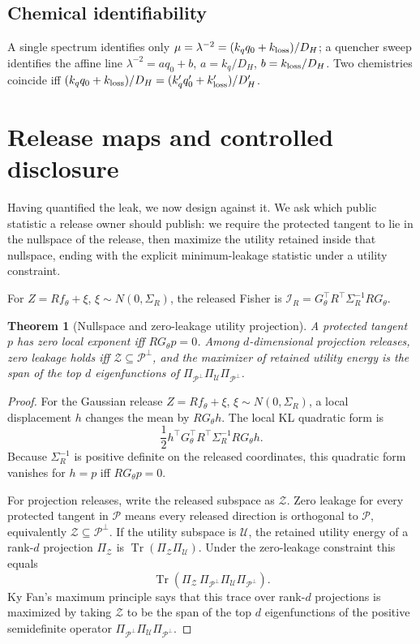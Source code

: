 \documentclass[11pt]{article}
\newtheorem{theorem}{Theorem}
\DeclareMathOperator{\Tr}{Tr}
\newcommand{\calI}{\mathcal I}
\newcommand{\calP}{\mathcal P}
\newcommand{\calU}{\mathcal U}
\newcommand{\calZ}{\mathcal Z}
\begin{document}
\subsection{Chemical identifiability}

A single spectrum identifies only \(\mu=\lambda^{-2}=(k_qq_0+k_{\rm loss})/D_H\); a quencher sweep identifies the affine line \(\lambda^{-2}=aq_0+b\), \(a=k_q/D_H\), \(b=k_{\rm loss}/D_H\). Two chemistries coincide iff \((k_qq_0+k_{\rm loss})/D_H=(k_q'q_0'+k_{\rm loss}')/D_H'\).

\section{Release maps and controlled disclosure}
\label{sec:release}

Having quantified the leak, we now design against it. We ask which public statistic a release owner should publish: we require the protected tangent to lie in the nullspace of the release, then maximize the utility retained inside that nullspace, ending with the explicit minimum-leakage statistic under a utility constraint.

For \(Z=Rf_\theta+\xi\), \(\xi\sim N(0,\Sigma_R)\), the released Fisher is \(\calI_R=G_\theta^\top R^\top\Sigma_R^{-1}RG_\theta\).

\begin{theorem}[Nullspace and zero-leakage utility projection]
\label{thm:projection-synthesis}
A protected tangent \(p\) has zero local exponent iff \(RG_\theta p=0\). Among \(d\)-dimensional projection releases, zero leakage holds iff \(\calZ\subseteq\calP^\perp\), and the maximizer of retained utility energy is the span of the top \(d\) eigenfunctions of \(\Pi_{\calP^\perp}\Pi_\calU\Pi_{\calP^\perp}\).
\end{theorem}

\begin{proof}
For the Gaussian release \(Z=Rf_\theta+\xi\), \(\xi\sim N(0,\Sigma_R)\), a local displacement \(h\) changes the mean by \(RG_\theta h\). The local KL quadratic form is
\[
\frac12 h^\top G_\theta^\top R^\top\Sigma_R^{-1}RG_\theta h.
\]
Because \(\Sigma_R^{-1}\) is positive definite on the released coordinates, this quadratic form vanishes for \(h=p\) iff \(RG_\theta p=0\).

For projection releases, write the released subspace as \(\calZ\). Zero leakage for every protected tangent in \(\calP\) means every released direction is orthogonal to \(\calP\), equivalently \(\calZ\subseteq\calP^\perp\). If the utility subspace is \(\calU\), the retained utility energy of a rank-\(d\) projection \(\Pi_\calZ\) is \(\Tr(\Pi_\calZ\Pi_\calU)\). Under the zero-leakage constraint this equals
\[
\Tr\!\left(\Pi_\calZ\,\Pi_{\calP^\perp}\Pi_\calU\Pi_{\calP^\perp}\right).
\]
Ky Fan's maximum principle says that this trace over rank-\(d\) projections is maximized by taking \(\calZ\) to be the span of the top \(d\) eigenfunctions of the positive semidefinite operator \(\Pi_{\calP^\perp}\Pi_\calU\Pi_{\calP^\perp}\).
\end{proof}
\end{document}
